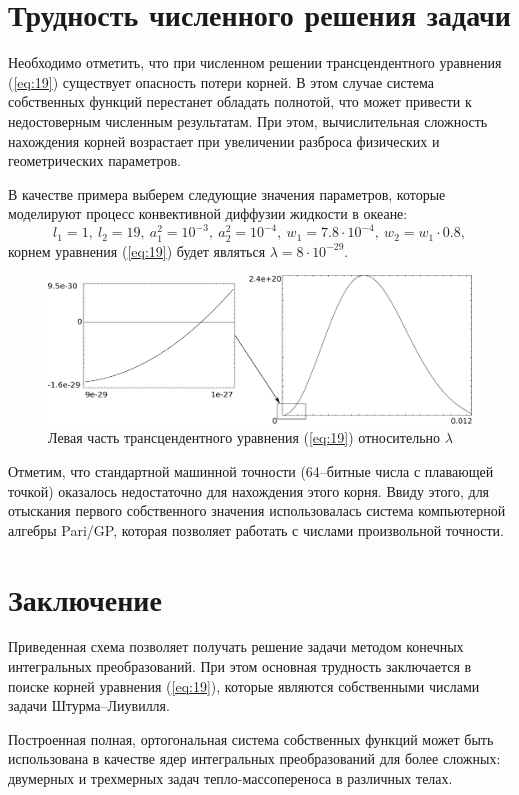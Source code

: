 \documentclass[12pt, a4paper, draft]{article}
\begin{document}
\section{Трудность численного решения задачи}
Необходимо отметить, что при численном решении трансцендентного уравнения (\ref{eq:19}) существует опасность потери корней.
В этом случае система собственных функций перестанет обладать полнотой, что может привести к недостоверным численным результатам.
При этом, вычислительная сложность нахождения корней возрастает при увеличении разброса физических и геометрических параметров.

В качестве примера выберем следующие значения параметров, которые моделируют процесс конвективной диффузии жидкости в океане:
\begin{equation*}
  l_1=1,\ l_2=19,\ a_1^2=10^{-3},\ a_2^2=10^{-4},\ w_1=7.8\cdot 10^{-4},\ w_2=w_1 \cdot 0.8,
\end{equation*}
корнем уравнения (\ref{eq:19}) будет являться $\lambda=8 \cdot 10^{-29}$.
\begin{figure}[H]
 \includegraphics[width=16cm]{full.eps}
 \caption{Левая часть трансцендентного уравнения (\ref{eq:19}) относительно $\lambda$}
 \label{fig:2}
\end{figure}
Отметим, что стандартной машинной точности (64--битные числа с плавающей точкой) оказалось недостаточно для нахождения этого корня.
Ввиду этого, для отыскания первого собственного значения использовалась система компьютерной алгебры Pari/GP, 
которая позволяет работать с числами произвольной точности.

\section{Заключение}
Приведенная схема позволяет получать решение задачи методом конечных интегральных преобразований.
При этом основная трудность заключается в поиске корней уравнения (\ref{eq:19}), которые являются
собственными числами задачи Штурма--Лиувилля.

Построенная полная, ортогональная система собственных функций может быть использована в качестве ядер
интегральных преобразований для более сложных: двумерных и трехмерных задач тепло-массопереноса в различных телах.
\end{document}
